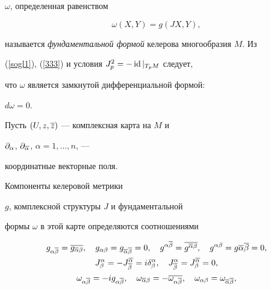 $\omega$, определенная равенством


\begin{equation}


\label{333}


\omega(X,Y)=g(JX,Y),


\end{equation}


называется {\it фундаментальной формой} келерова многообразия $M$. Из


(\ref{sogl1}), (\ref{333}) и условия $J_p^2 = -\operatorname{id}|_{T_pM}$ следует,


что $\omega$ является замкнутой дифференциальной формой:


$d\omega=0$.





Пусть $(U,z,\overline z)$ --- комплексная карта на $M$ и


$\partial_{\alpha}$, $\partial_{\overline\alpha}$, $\alpha=1,\dotsc,n$, ---


координатные векторные поля.


Компоненты келеровой метрики


$g$, комплексной структуры $J$ и фундаментальной


формы $\omega$ в этой карте определяются соотношениями


\begin{gather}


\label{mherm}


g_{\alpha\ol\beta}=\ol {g_{\ol\alpha\beta}},\quad


g_{\alpha\beta}=g_{\ol\alpha\ol\beta}=0,\quad


g^{\alpha\ol\beta}=\ol{g^{\ol\alpha\beta}}, \quad


g^{\alpha\beta}=g{\ol\alpha\ol\beta}=0,\\


\label{comJ}


J^\alpha_{\beta}=- J_{\ol\beta}^{\ol\alpha}=i\delta^\alpha_\beta,\quad


J^\alpha_{\ol\beta} = J_{\beta}^{\ol\alpha} = 0,\\


\label{com-omega}


\omega_{\alpha\ol\beta}=-i g_{\alpha\ol\beta}, \quad


\omega_{\ol\alpha\beta}=- \ol{\omega_{\alpha\ol\beta}},\quad


\omega_{\alpha\beta}=\omega_{\ol\alpha\ol\beta},


\end{gather}



